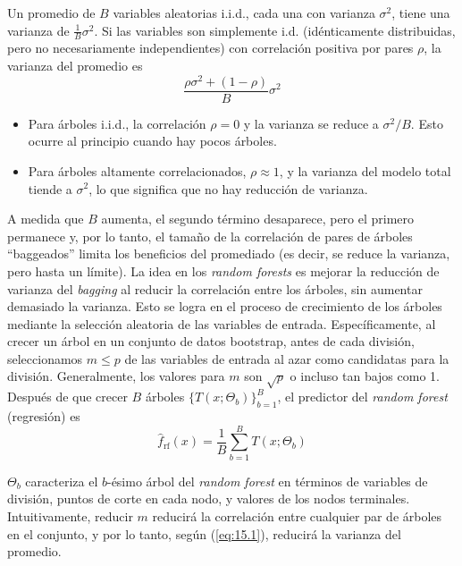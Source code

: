 Un promedio de $B$ variables aleatorias i.i.d., cada una con varianza $\sigma^2$, tiene una varianza de $\frac{1}{B} \sigma^2$. Si las variables son simplemente i.d. (idénticamente distribuidas, pero no necesariamente independientes) con correlación positiva por pares $\rho$, la varianza del promedio es
\begin{equation}
\frac{\rho \sigma^2 + (1 - \rho)}{B} \sigma^2
\label{eq:15.1}
\end{equation}

\begin{itemize}
\item Para árboles i.i.d., la correlación $\rho = 0$ y la varianza se reduce a $\sigma^2/B$. Esto ocurre al principio cuando hay pocos árboles.
\item Para árboles altamente correlacionados, $\rho \approx 1$, y la varianza del modelo total tiende a $\sigma^2$, lo que significa que no hay reducción de varianza.
\end{itemize}

A medida que $B$ aumenta, el segundo término desaparece, pero el primero permanece y, por lo tanto, el tamaño de la correlación de pares de árboles ``baggeados'' limita los beneficios del promediado (es decir, se reduce la varianza, pero hasta un límite). La idea en los \textit{random forests} es mejorar la reducción de varianza del \textit{bagging} al reducir la correlación entre los árboles, sin aumentar demasiado la varianza. Esto se logra en el proceso de crecimiento de los árboles mediante la selección aleatoria de las variables de entrada. Específicamente, al crecer un árbol en un conjunto de datos bootstrap, antes de cada división, seleccionamos $m \leq p$ de las variables de entrada al azar como candidatas para la división. Generalmente, los valores para $m$ son $\sqrt{p}$ o incluso tan bajos como 1.\\

Después de que crecer $B$ árboles $\{T(x; \Theta_b)\}_{b=1}^B$, el predictor del \textit{random forest} (regresión) es
\begin{equation}
\hat{f}_{\text{rf}}(x) = \frac{1}{B} \sum_{b=1}^{B} T(x; \Theta_b)
\label{eq:15.2}
\end{equation}

$\Theta_b$ caracteriza el $b$-ésimo árbol del \textit{random forest} en términos de variables de división, puntos de corte en cada nodo, y valores de los nodos terminales. Intuitivamente, reducir $m$ reducirá la correlación entre cualquier par de árboles en el conjunto, y por lo tanto, según (\ref{eq:15.1}), reducirá la varianza del promedio. \\

